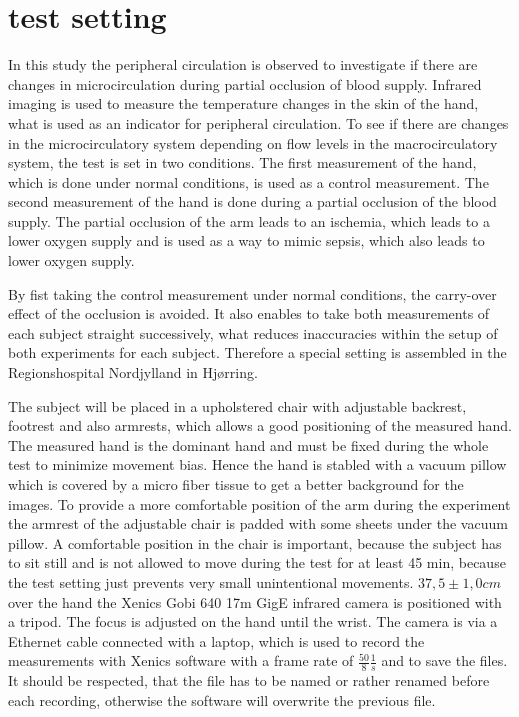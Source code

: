 \chapter{test setting}
In this study the peripheral circulation is observed to investigate if there are changes in microcirculation during partial occlusion of blood supply. Infrared imaging is used to measure the temperature changes in the skin of the hand, what is used as an indicator for peripheral circulation. 
To see if there are changes in the microcirculatory system depending on flow levels in the macrocirculatory system, the test is set in two conditions. The first measurement of the hand, which is done under normal conditions, is used as a control measurement. The second measurement of the hand is done during a partial occlusion of the blood supply. The partial occlusion of the arm leads to an ischemia, which leads to a lower oxygen supply and is used as a way to mimic sepsis, which also leads to lower oxygen supply. 

By fist taking the control measurement under normal conditions, the carry-over effect of the occlusion is avoided. It also enables to take both measurements of each subject straight successively, what reduces inaccuracies within the setup of both experiments for each subject. Therefore a special setting is assembled in the Regionshospital Nordjylland in Hj\o{}rring.

The subject will be placed in a upholstered chair with adjustable backrest, footrest and also armrests, which allows a good positioning of the measured hand. The measured hand is the dominant hand and must be fixed during the whole test to minimize movement bias. Hence the hand is stabled with a vacuum pillow which is covered by a micro fiber tissue to get a better background for the images. To provide a more comfortable position of the arm during the experiment the armrest of the adjustable chair is padded with some sheets under the vacuum pillow. A comfortable position in the chair is important, because the subject has to sit still and is not allowed to move during the test for at least 45 min, because the test setting just prevents very small unintentional movements.
$37,5\pm 1,0 cm$ over the hand the Xenics Gobi 640 17\mu m GigE infrared camera is positioned with a tripod. The focus is adjusted on the hand until the wrist.
The camera is via a Ethernet cable connected with a laptop, which is used to record the measurements with Xenics software with a frame rate of $ \frac{50}{8} \frac{1}{s} $ and to save the files. It should be respected, that the file has to be named or rather renamed before each recording, otherwise the software will overwrite the previous file.

